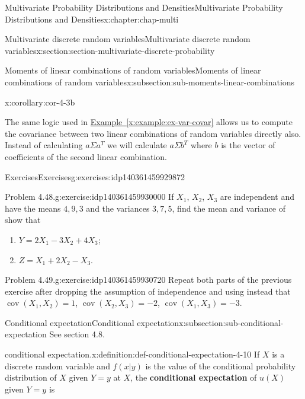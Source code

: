 \documentclass[oneside,10pt,]{book}
\newcommand{\xreffont}{\relax}
\newcommand{\terminology}[1]{\textbf{#1}}
\numberwithin{equation}{section}
\begin{document}
\begin{chapterptx}{Multivariate Probability Distributions and Densities}{}{Multivariate Probability Distributions and Densities}{}{}{x:chapter:chap-multi}
\begin{sectionptx}{Multivariate discrete random variables}{}{Multivariate discrete random variables}{}{}{x:section:section-multivariate-discrete-probability}
\begin{subsectionptx}{Moments of linear combinations of random variables}{}{Moments of linear combinations of random variables}{}{}{x:subsection:sub-moments-linear-combinations}
\begin{corollary}{}{}{x:corollary:cor-4-3b}
%
\end{corollary}
 The same logic used in \hyperref[x:example:ex-var-covar]{Example~{\xreffont\ref{x:example:ex-var-covar}}} allows us to compute the covariance between two linear combinations of random variables directly also. Instead of calculating \(a\Sigma a^T\) we will calculate \(a \Sigma b^T\) where \(b\) is the vector of coefficients of the second linear combination.\end{subsectionptx}
%
%
\typeout{************************************************}
\typeout{************************************************}
%
\begin{exercises-subsection}{Exercises}{}{Exercises}{}{}{g:exercises:idp140361459929872}
\begin{divisionexercise}{1}{Problem 4.48.}{}{g:exercise:idp140361459930000}%
If \(X_1\), \(X_2\), \(X_3\) are independent and have the means \(4, 9, 3\) and the variances \(3, 7, 5\), find the mean and variance of  show that%
\begin{enumerate}[label=(\alph*)]
\item{}\(Y = 2X_1 - 3X_2 + 4X_3\);%
\item{}\(Z = X_1 + 2X_2 -X_3\).%
\end{enumerate}
%
\end{divisionexercise}%
\begin{divisionexercise}{2}{Problem 4.49.}{}{g:exercise:idp140361459930720}%
Repeat both parts of the previous exercise after dropping the assumption of independence and using instead that \(\operatorname{cov}(X_1, X_2) = 1\), \(\operatorname{cov}(X_2, X_3)
= -2\), \(\operatorname{cov}(X_1, X_3) = -3\).%
\end{divisionexercise}%
\end{exercises-subsection}
%
%
\typeout{************************************************}
\typeout{************************************************}
%
\begin{subsectionptx}{Conditional expectation}{}{Conditional expectation}{}{}{x:subsection:sub-conditional-expectation}
See section 4.8.%
\begin{definition}{conditional expectation.}{x:definition:def-conditional-expectation-4-10}%
If \(X\) is a discrete random variable and \(\displaystyle f(x|y)\) is the value of the conditional probability distribution of \(X\) given \(\displaystyle Y = y\) at \(X\), the \terminology{conditional expectation} of \(\displaystyle u(X)\) given \(\displaystyle Y = y\) is%

\end{definition}
\end{subsectionptx}
\end{sectionptx}
\end{chapterptx}
\end{document}
